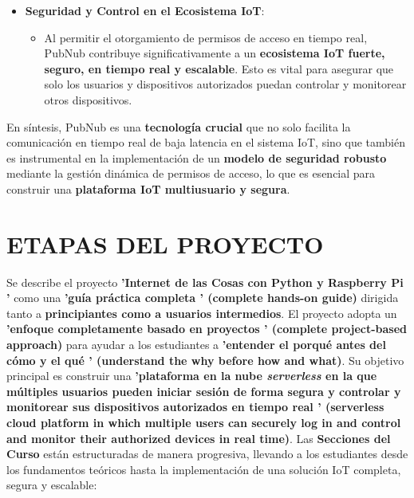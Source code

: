 \documentclass{report}
\begin{document}
\begin{itemize}
    \item \textbf{Seguridad y Control en el Ecosistema IoT}:
    \begin{itemize}
        \item Al permitir el otorgamiento de permisos de acceso en tiempo real, PubNub contribuye significativamente a un 
        \textbf{ecosistema IoT fuerte, seguro, en tiempo real y escalable}. Esto es vital para asegurar que solo los usuarios y 
        dispositivos autorizados puedan controlar y monitorear otros dispositivos.
    \end{itemize}
\end{itemize}
En síntesis, PubNub es una \textbf{tecnología crucial} que no solo facilita la comunicación en tiempo real de baja latencia en el 
sistema IoT, sino que también es instrumental en la implementación de un \textbf{modelo de seguridad robusto} mediante la gestión dinámica 
de permisos de acceso, lo que es esencial para construir una \textbf{plataforma IoT multiusuario y segura}.

\chapter{ETAPAS DEL PROYECTO}
Se describe el proyecto \textbf{ 'Internet de las Cosas con Python y Raspberry Pi '} como una \textbf{ 'guía práctica completa ' (complete 
hands-on guide)} dirigida tanto a \textbf{principiantes como a usuarios intermedios}. El proyecto adopta un \textbf{ 'enfoque completamente basado en 
proyectos ' (complete project-based approach)} para ayudar a los estudiantes a \textbf{ 'entender el porqué antes del cómo y el qué ' (understand the why 
before how and what)}. Su objetivo principal es construir una \textbf{ 'plataforma en la nube \textit{serverless} en la que múltiples usuarios pueden 
iniciar sesión de forma segura y controlar y monitorear sus dispositivos autorizados en tiempo real ' (serverless cloud platform in which multiple users 
can securely log in and control and monitor their authorized devices in real time)}. Las \textbf{Secciones del Curso} están estructuradas de manera 
progresiva, llevando a los estudiantes desde los fundamentos teóricos hasta la implementación de una solución IoT completa, segura y escalable:
\end{document}
